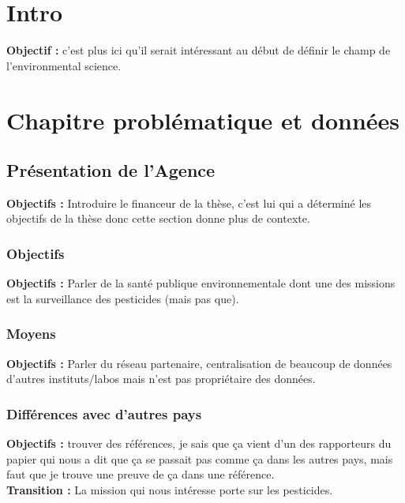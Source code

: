 \documentclass[12pt, twoside]{report}
\begin{document}
\dominitoc
\tableofcontents								     

\chapter{Intro}

\textbf{Objectif :} c'est plus ici qu'il serait intéressant au début de définir le champ de l'environmental science.

\chapter{Chapitre problématique et données}



\section{Présentation de l'Agence}

\textbf{Objectifs :} Introduire le financeur de la thèse, c'est lui qui a déterminé les objectifs de la thèse donc cette section donne plus de contexte.  

\subsection{Objectifs}

\textbf{Objectifs :} Parler de la santé publique environnementale dont une des missions est la surveillance des pesticides (mais pas que).  

\subsection{Moyens}

\textbf{Objectifs :} Parler du réseau partenaire, centralisation de beaucoup de données d'autres instituts/labos mais n'est pas propriétaire des données.   

\subsection{Différences avec d'autres pays}

\textbf{Objectifs :} trouver des références, je sais que ça vient d'un des rapporteurs du papier qui nous a dit que ça se passait pas comme ça dans les autres pays, mais faut que je trouve une preuve de ça dans une référence. \\

\textbf{Transition :} La mission qui nous intéresse porte sur les pesticides.
\end{document}
